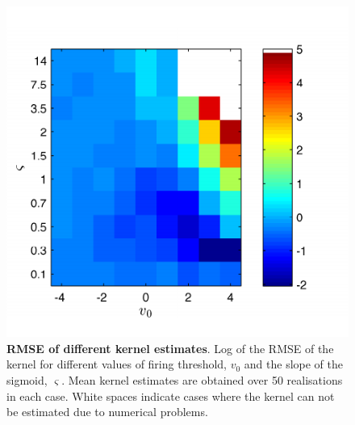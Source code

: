 \documentclass[12pt]{iopart}
\begin{document}
\begin{figure}[!ht]
\begin{center}
\includegraphics{./Graph/pdf/RMSESigmoidParameters.pdf}
\end{center}
\caption{{\bf RMSE of different kernel estimates}. Log of the RMSE of the kernel for different values of firing threshold, $v_0$ and the slope of the sigmoid, $\varsigma$. Mean kernel estimates are obtained over 50 realisations in each case. White spaces indicate cases where the kernel can not be estimated due to numerical problems.}
\label{fig:Figure12}
\end{figure}
\end{document}
